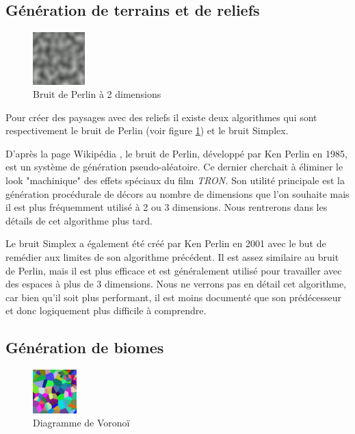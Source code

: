 \documentclass[12pt]{article}
\begin{document}
\subsection{Génération de terrains et de reliefs}

\begin{figure} %
  \centering
  \includegraphics[width=0.18\textwidth]{assets/Perlin_noise.jpg}
  \caption{Bruit de Perlin à 2 dimensions}
  \label{perlin}
\end{figure}

Pour créer des paysages avec des reliefs il existe deux algorithmes qui sont respectivement le bruit de Perlin (voir figure \ref{perlin}) et le bruit Simplex.\par
D'après la page Wikipédia \cite{perlin}, le bruit de Perlin, développé par Ken Perlin en 1985, est un système de génération pseudo-aléatoire. Ce dernier cherchait à éliminer le look "machinique" des effets spéciaux du film \textit{TRON.} Son utilité principale est la génération procédurale de décors au nombre de dimensions que l'on souhaite mais il est plus fréquemment utilisé à 2 ou 3 dimensions. Nous rentrerons dans les détails de cet algorithme plus tard.\par
Le bruit Simplex \cite{simplex_noise} a également été créé par Ken Perlin en 2001 avec le but de remédier aux limites de son algorithme précédent. Il est assez similaire au bruit de Perlin, mais il est plus efficace et est généralement utilisé pour travailler avec des espaces à plus de 3 dimensions. Nous ne verrons pas en détail cet algorithme, car bien qu'il soit plus performant, il est moins documenté que son prédécesseur et donc logiquement plus difficile à comprendre.
\vspace{1cm}
\subsection{Génération de biomes}

\begin{figure} %
  \centering
  \includegraphics[width=0.15\textwidth]{assets/voronoi.png}
  \caption{Diagramme de Voronoï}
  \label{voronoi}
\end{figure}
\end{document}
